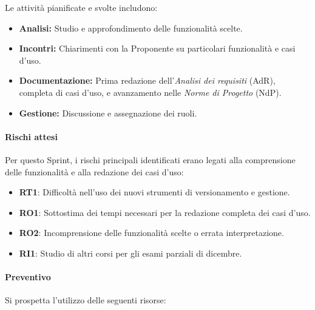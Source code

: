 \documentclass[a4paper,12pt]{article}
\begin{document}
Le attività pianificate e svolte includono:
\begin{itemize}
    \item \textbf{Analisi:} Studio e approfondimento delle funzionalità scelte.
    \item \textbf{Incontri:} Chiarimenti con la Proponente su particolari funzionalit\`a e casi d'uso.
    \item \textbf{Documentazione:} Prima redazione dell'\textit{Analisi dei requisiti} (AdR), completa di casi d'uso, e avanzamento nelle \textit{Norme di Progetto} (NdP).
    \item \textbf{Gestione:} Discussione e assegnazione dei ruoli.
\end{itemize}

\paragraph{Rischi attesi}
Per questo Sprint, i rischi principali identificati erano legati alla comprensione delle funzionalit\`a e alla redazione dei casi d'uso:
\begin{itemize}
    
    \item \textbf{RT1}: Difficoltà nell'uso dei nuovi strumenti di versionamento e gestione.
    \item \textbf{RO1}: Sottostima dei tempi necessari per la redazione completa dei casi d'uso.
    \item \textbf{RO2}: Incomprensione delle funzionalit\`a scelte o errata interpretazione.
    \item \textbf{RI1}: Studio di altri corsi per gli esami parziali di dicembre.
\end{itemize}

\paragraph{Preventivo}
Si prospetta l'utilizzo delle seguenti risorse:
\end{document}
